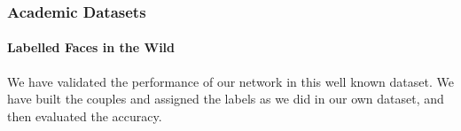 
\subsubsection{Academic Datasets}
\paragraph{Labelled Faces in the Wild} We have validated the performance of our network in this well known dataset. We have built the couples and assigned the labels as we did in our own dataset, and then evaluated the accuracy.
